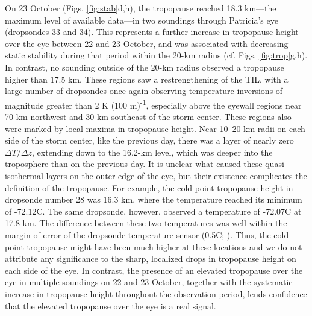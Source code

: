 On 23 October (Figs. \ref{fig:stab}d,h), the tropopause reached 18.3 km---the maximum level of available data---in two soundings through Patricia’s eye (dropsondes 33 and
34).
This represents a further increase in tropopause height over the eye between 22 and 23 October, and was associated with decreasing static stability during that period within the 20-km radius (cf. Figs. \ref{fig:trop}g,h).
In contrast, no sounding outside of the 20-km radius observed a tropopause higher than 17.5 km.
These regions saw a restrengthening of the TIL, with a large number of dropsondes once again observing temperature inversions of magnitude greater than 2 K (100 m)\textsuperscript{-1}, especially above the eyewall regions near 70 km northwest and 30 km southeast of the storm center.
These regions also were marked by local maxima in tropopause height.
Near 10--20-km radii on each side of the storm center, like the previous day, there was a layer of nearly zero $\Delta T/\Delta z$, extending down to the 16.2-km level, which was deeper into the troposphere than on the previous day.
It is unclear what caused these quasi-isothermal layers on the outer edge of the eye, but their existence complicates the definition of the tropopause.
For example, the cold-point tropopause height in dropsonde number 28 was 16.3 km, where the temperature reached its minimum of -72.12\textdegree{}C.
The same dropsonde, however, observed a temperature of -72.07\textdegree{}C at 17.8 km.
The difference between these two temperatures was well within the margin of error of the dropsonde temperature sensor (0.5\textdegree{}C; \citeauthor{BellTCI} \citeyear{BellTCI}).
Thus, the cold-point tropopause might have been much higher at these locations and we do not attribute any significance to the sharp, localized drops in tropopause height on each side of the eye.
In contrast, the presence of an elevated tropopause over the eye in multiple soundings on 22 and 23 October, together with the systematic increase in tropopause height throughout the observation period, lends confidence that the elevated tropopause over the eye is a real signal.

